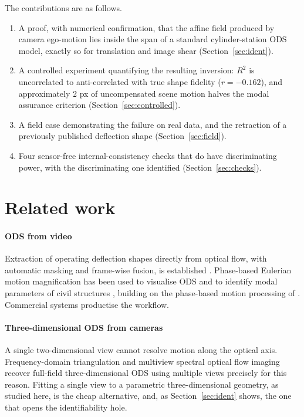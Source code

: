 \documentclass[preprint,12pt]{elsarticle}
\begin{document}
The contributions are as follows.
\begin{enumerate}
\item A proof, with numerical confirmation, that the affine field produced
  by camera ego-motion lies inside the span of a standard cylinder-station
  ODS model, exactly so for translation and image shear
  (Section~\ref{sec:ident}).
\item A controlled experiment quantifying the resulting inversion: $R^2$ is
  uncorrelated to anti-correlated with true shape fidelity
  ($r = -0.162$), and approximately 2 px of uncompensated scene motion
  halves the modal assurance criterion (Section~\ref{sec:controlled}).
\item A field case demonstrating the failure on real data, and the
  retraction of a previously published deflection shape
  (Section~\ref{sec:field}).
\item Four sensor-free internal-consistency checks that do have
  discriminating power, with the discriminating one identified
  (Section~\ref{sec:checks}).
\end{enumerate}

\section{Related work}
\label{sec:related}

\paragraph{ODS from video}
Extraction of operating deflection shapes directly from optical flow, with
automatic masking and frame-wise fusion, is established \cite{machynia2021}.
Phase-based Eulerian motion magnification has been used to visualise ODS and
to identify modal parameters of civil structures
\cite{chen2015,chen2017}, building on the phase-based motion processing of
\cite{wadhwa2013}. Commercial systems productise the workflow.

\paragraph{Three-dimensional ODS from cameras}
A single two-dimensional view cannot resolve motion along the optical axis.
Frequency-domain triangulation \cite{gorjup2019} and multiview spectral
optical flow imaging \cite{gorjup2021} recover full-field three-dimensional
ODS using multiple views precisely for this reason. Fitting a single view to
a parametric three-dimensional geometry, as studied here, is the cheap
alternative, and, as Section~\ref{sec:ident} shows, the one that opens the
identifiability hole.
\end{document}
